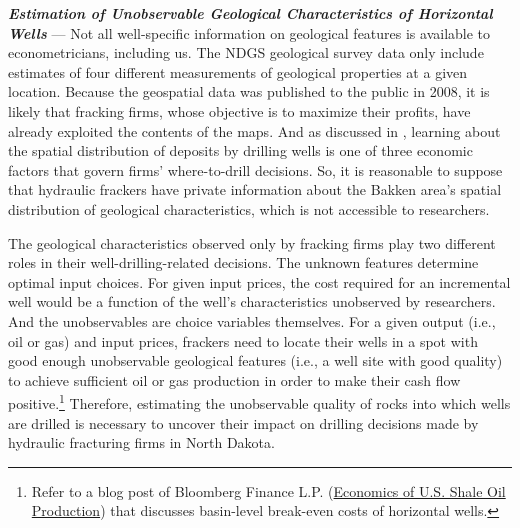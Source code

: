 \textit{\textbf{Estimation of Unobservable Geological Characteristics of Horizontal Wells}} --- Not all well-specific information on geological features is available to econometricians, including us. The NDGS geological survey data only include estimates of four different measurements of geological properties at a given location. Because the geospatial data was published to the public in 2008, it is likely that fracking firms, whose objective is to maximize their profits, have already exploited the contents of the maps. And as discussed in \cite{Learning-where-to-drill_Agerton_2020}, learning about the spatial distribution of deposits by drilling wells is one of three economic factors that govern firms' where-to-drill decisions. So, it is reasonable to suppose that hydraulic frackers have private information about the Bakken area's spatial distribution of geological characteristics, which is not accessible to researchers. 

The geological characteristics observed only by fracking firms play two different roles in their well-drilling-related decisions. The unknown features determine optimal input choices. For given input prices, the cost required for an incremental well would be a function of the well's characteristics unobserved by researchers. And the unobservables are choice variables themselves. For a given output (i.e., oil or gas) and input prices, frackers need to locate their wells in a spot with good enough unobservable geological features (i.e., a well site with good quality) to achieve sufficient oil or gas production in order to make their cash flow positive.\footnote{Refer to a blog post of Bloomberg Finance L.P. (\href{https://about.bnef.com/blog/economics-u-s-shale-oil-production}{Economics of U.S. Shale Oil Production}) that discusses basin-level break-even costs of horizontal wells.} Therefore, estimating the unobservable quality of rocks into which wells are drilled is necessary to uncover their impact on drilling decisions made by hydraulic fracturing firms in North Dakota. 

